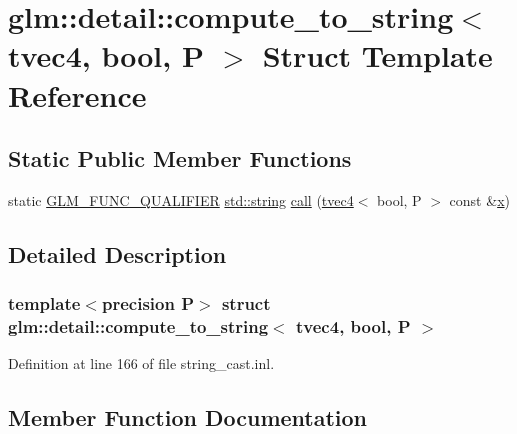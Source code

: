 \hypertarget{structglm_1_1detail_1_1compute__to__string_3_01tvec4_00_01bool_00_01_p_01_4}{}\section{glm\+::detail\+::compute\+\_\+to\+\_\+string$<$ tvec4, bool, P $>$ Struct Template Reference}
\label{structglm_1_1detail_1_1compute__to__string_3_01tvec4_00_01bool_00_01_p_01_4}
\subsection*{Static Public Member Functions}
\begin{DoxyCompactItemize}
\item 
static \mbox{\hyperlink{setup_8hpp_a33fdea6f91c5f834105f7415e2a64407}{G\+L\+M\+\_\+\+F\+U\+N\+C\+\_\+\+Q\+U\+A\+L\+I\+F\+I\+ER}} \mbox{\hyperlink{glad_8h_ac83513893df92266f79a515488701770}{std\+::string}} \mbox{\hyperlink{structglm_1_1detail_1_1compute__to__string_3_01tvec4_00_01bool_00_01_p_01_4_a22a41058af4ceb92f6c12ad968a4205d}{call}} (\mbox{\hyperlink{structglm_1_1tvec4}{tvec4}}$<$ bool, P $>$ const \&\mbox{\hyperlink{glad_8h_a92d0386e5c19fb81ea88c9f99644ab1d}{x}})
\end{DoxyCompactItemize}


\subsection{Detailed Description}
\subsubsection*{template$<$precision P$>$\newline
struct glm\+::detail\+::compute\+\_\+to\+\_\+string$<$ tvec4, bool, P $>$}



Definition at line 166 of file string\+\_\+cast.\+inl.



\subsection{Member Function Documentation}
\mbox{\label{structglm_1_1detail_1_1compute__to__string_3_01tvec4_00_01bool_00_01_p_01_4_a22a41058af4ceb92f6c12ad968a4205d}} 
